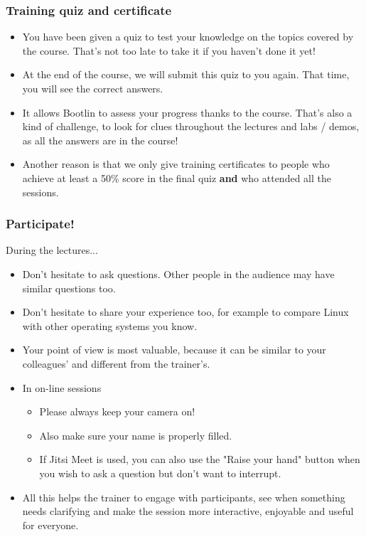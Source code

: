 \begin{frame}
\frametitle{Training quiz and certificate}
\begin{itemize}
\item You have been given a quiz to test your knowledge
      on the topics covered by the course.
      That's not too late to take it if you haven't done it yet!
\item At the end of the course, we will submit this quiz
      to you again. That time, you will see the correct answers.
\item It allows Bootlin to assess your progress thanks to the course.
      That's also a kind of challenge, to look for clues throughout
      the lectures and labs / demos, as all the answers are in the course!
\item Another reason is that we only give training certificates
      to people who achieve at least a 50\% score in the final quiz
      {\bf and} who attended all the sessions.
\end{itemize}
\end{frame}

\begin{frame}

\frametitle{Participate!}
During the lectures...
\begin{itemize}
\item Don't hesitate to ask questions. Other people in the audience may have
similar questions too.
\item Don't hesitate to share your experience too, for example to compare Linux
with other operating systems you know.
\item Your point of view is most valuable, because it can be similar to your
colleagues' and different from the trainer's.
\item In on-line sessions
   \begin{itemize}
   \item Please always keep your camera on!
   \item Also make sure your name is properly filled.
   \item If Jitsi Meet is used, you can also use the "Raise your hand"
         button when you wish to ask a question but don't want to
	 interrupt.
   \end{itemize}
\item All this helps the trainer to engage with participants, see when
something needs clarifying and make the session more interactive, enjoyable
and useful for everyone.
\end{itemize}
\end{frame}

